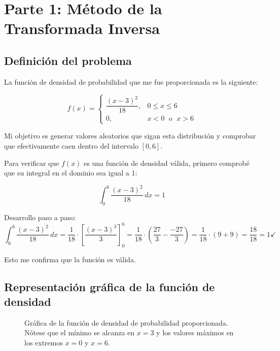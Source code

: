 \documentclass[12pt,a4paper]{article}
\begin{document}
\newpage

\section{Parte 1: Método de la Transformada Inversa}

\subsection{Definición del problema}

La función de densidad de probabilidad que me fue proporcionada es la siguiente:

\[
f(x) =
\begin{cases}
\dfrac{(x-3)^2}{18}{}, & 0 \leq x \leq 6 \\[6pt]
0, & x < 0 \;\text{ o }\; x > 6
\end{cases}
\]

Mi objetivo es generar valores aleatorios que sigan esta distribución y comprobar que efectivamente caen dentro del intervalo $[0, 6]$.

Para verificar que $f(x)$ es una función de densidad válida, primero comprobé que su integral en el dominio sea igual a 1:

\[
\int_0^6 \frac{(x-3)^2}{18}\, dx = 1
\]

Desarrollo paso a paso:
\[
\int_0^6 \frac{(x-3)^2}{18}\, dx
= \frac{1}{18} \cdot \left[\frac{(x-3)^3}{3}\right]_0^6
= \frac{1}{18} \cdot \left(\frac{27}{3} - \frac{-27}{3}\right)
= \frac{1}{18} \cdot (9 + 9) = \frac{18}{18} = 1 \checkmark{}
\]

Esto me confirma que la función es válida.

\subsection{Representación gráfica de la función de densidad}

\begin{figure}[H]
\centering
{}
\caption{Gráfica de la función de densidad de probabilidad proporcionada. Nótese que el mínimo se alcanza en $x=3$ y los valores máximos en los extremos $x=0$ y $x=6$.}
\end{figure}
\end{document}

